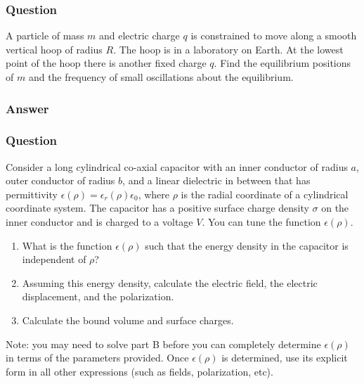 \subsubsection{Question}
A particle of mass $m$ and electric charge $q$ is constrained to move along a smooth vertical hoop of radius $R$. The hoop is in a laboratory on Earth. At the lowest point of the hoop there is another fixed charge $q$. Find the equilibrium positions of $m$ and the frequency of small oscillations about the equilibrium.
\subsubsection{Answer}


\subsubsection{Question}
Consider a long cylindrical co-axial capacitor with an inner conductor of radius $a$, outer conductor of radius $b$, and a linear dielectric in between that has permittivity $\epsilon(\rho)=\epsilon_r(\rho)\epsilon_0$, where $\rho$ is the radial coordinate of a cylindrical coordinate system. The capacitor has a positive surface charge density $\sigma$ on the inner conductor and is charged to a voltage $V$. You can tune the function $\epsilon(\rho)$.
\begin{enumerate}
	\item What is the function $\epsilon(\rho)$ such that the energy density in the capacitor is independent of $\rho$?
	\item Assuming this energy density, calculate the electric field, the electric displacement, and the polarization.
	\item Calculate the bound volume and surface charges.
\end{enumerate}
Note: you may need to solve part B before you can completely determine $\epsilon(\rho)$ in terms of the parameters provided. Once $\epsilon(\rho)$ is determined, use its explicit form in all other expressions (such as fields, polarization, etc).
